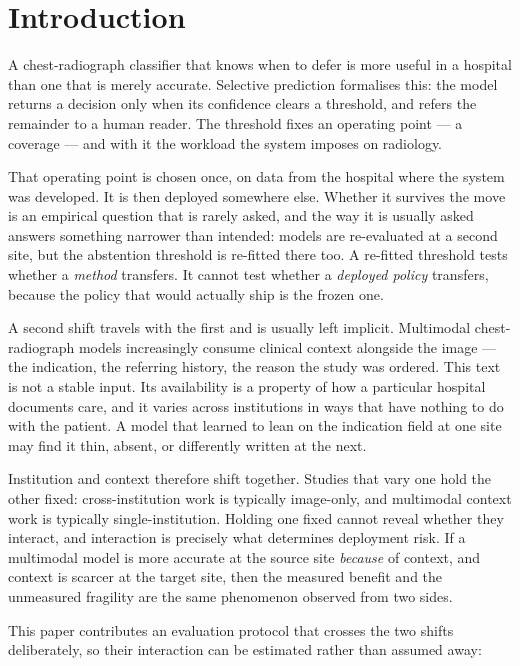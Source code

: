 \section{Introduction}
\label{sec:introduction}

A chest-radiograph classifier that knows when to defer is more useful in a
hospital than one that is merely accurate. Selective prediction formalises
this: the model returns a decision only when its confidence clears a threshold,
and refers the remainder to a human reader. The threshold fixes an operating
point --- a coverage --- and with it the workload the system imposes on
radiology.

That operating point is chosen once, on data from the hospital where the system
was developed. It is then deployed somewhere else. Whether it survives the move
is an empirical question that is rarely asked, and the way it is usually asked
answers something narrower than intended: models are re-evaluated at a second
site, but the abstention threshold is re-fitted there too. A re-fitted threshold
tests whether a \emph{method} transfers. It cannot test whether a \emph{deployed
policy} transfers, because the policy that would actually ship is the frozen
one.

A second shift travels with the first and is usually left implicit. Multimodal
chest-radiograph models increasingly consume clinical context alongside the
image --- the indication, the referring history, the reason the study was
ordered. This text is not a stable input. Its availability is a property of how
a particular hospital documents care, and it varies across institutions in ways
that have nothing to do with the patient. A model that learned to lean on the
indication field at one site may find it thin, absent, or differently written at
the next.

Institution and context therefore shift together. Studies that vary one hold the
other fixed: cross-institution work is typically image-only, and multimodal
context work is typically single-institution. Holding one fixed cannot reveal
whether they interact, and interaction is precisely what determines deployment
risk. If a multimodal model is more accurate at the source site \emph{because}
of context, and context is scarcer at the target site, then the measured benefit
and the unmeasured fragility are the same phenomenon observed from two sides.

This paper contributes an evaluation protocol that crosses the two shifts
deliberately, so their interaction can be estimated rather than assumed away:

